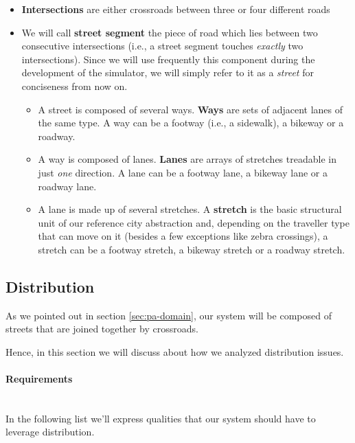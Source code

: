 \begin{itemize}
  \item \textbf{Intersections} are either crossroads between three or four
    different roads
  \item We will call \textbf{street segment} the piece of road which lies
    between two consecutive intersections (i.e., a street segment touches
    \textit{exactly} two intersections). Since we will use frequently this
    component during the development of the simulator, we will simply refer to
    it as a \textit{street} for conciseness from now on.
    \begin{itemize}
      \item A street is composed of several ways. \textbf{Ways} are sets of
        adjacent lanes of the same type. A way can be a footway (i.e., a
        sidewalk), a bikeway or a roadway.
      \item A way is composed of lanes. \textbf{Lanes} are arrays of stretches
        treadable in just \textit{one} direction. A lane can be a footway lane,
        a bikeway lane or a roadway lane.
      \item A lane is made up of several stretches. A \textbf{stretch} is the
        basic structural unit of our reference city abstraction and, depending
        on the traveller type that can move on it (besides a few exceptions
        like zebra crossings), a stretch can be a footway stretch, a bikeway
        stretch or a roadway stretch.
    \end{itemize}
\end{itemize}


\subsection{Distribution}\label{sec:pa-distribution}
As we pointed out in section \ref{sec:pa-domain}, our system will be composed
of streets that are joined together by crossroads.

Hence, in this section we will discuss about how we analyzed distribution issues.

\paragraph{Requirements} \mbox{} \\

In the following list we’ll express qualities that our system should have to leverage distribution.

